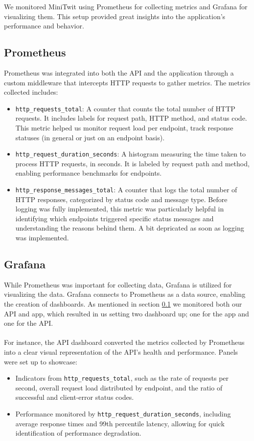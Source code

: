 We monitored MiniTwit using Prometheus for collecting metrics and Grafana for visualizing them. This setup provided great insights into the application's performance and behavior.

\subsection{Prometheus}\label{prom}
Prometheus was integrated into both the API and the application through a custom middleware that intercepts HTTP requests to gather metrics. The metrics collected includes:

\begin{itemize}
\item \texttt{http\_requests\_total}: A counter that counts the total number of HTTP requests. It includes labels for request path, HTTP method, and status code. This metric helped us monitor request load per endpoint, track response statuses (in general or just on an endpoint basis).
\item \texttt{http\_request\_duration\_seconds}: A histogram measuring the time taken to process HTTP requests, in seconds. It is labeled by request path and method, enabling performance benchmarks for endpoints.
\item \texttt{http\_response\_messages\_total}: A counter that logs the total number of HTTP responses, categorized by status code and message type. Before logging was fully implemented, this metric was particularly helpful in identifying which endpoints triggered specific status messages and understanding the reasons behind them. A bit depricated as soon as logging was implemented.
\end{itemize}

\subsection{Grafana}
While Prometheus was important for collecting data, Grafana is utilized for visualizing the data. Grafana connects to Prometheus as a data source, enabling the creation of dashboards. As mentioned in section \ref{prom} we monitored both our API and app, which resulted in us setting two dashboard up; one for the app and one for the API.
\\\\
For instance, the API dashboard converted the metrics collected by Prometheus into a clear visual representation of the API's health and performance. Panels were set up to showcase:
\begin{itemize}
    \item Indicators from \texttt{http\_requests\_total}, such as the rate of requests per second, overall request load distributed by endpoint, and the ratio of successful and client-error status codes.
    \item Performance monitored by \texttt{http\_request\_duration\_seconds}, including average response times and 99th percentile latency, allowing for quick identification of performance degradation.
\end{itemize}